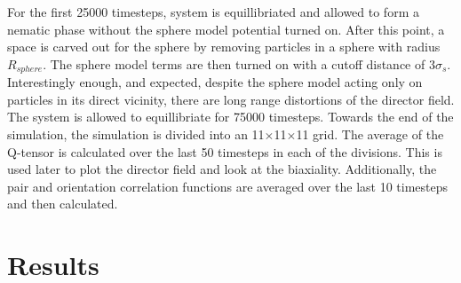 \documentclass[preprint, aps]{revtex4-1}
\begin{document}
For the first 25000 timesteps, system is equillibriated and allowed to form a
nematic phase without the sphere model potential turned on. After this point, a
space is carved out for the sphere by removing particles in a sphere with radius
$R_{sphere}$. The sphere model terms are then turned on with a cutoff distance
of $3\sigma_s$. Interestingly enough, and expected, despite the sphere model
acting only on particles in its direct vicinity, there are long range
distortions of the director field. The system is allowed to equillibriate for
75000 timesteps. Towards the end of the simulation, the simulation is divided
into an 11$\times$11$\times$11 grid. The average of the Q-tensor is calculated
over the last 50 timesteps in each of the divisions. This is used later to plot
the director field and look at the biaxiality. Additionally, the pair and
orientation correlation functions are averaged over the last 10 timesteps and 
then calculated.

\section*{Results}
\end{document}
